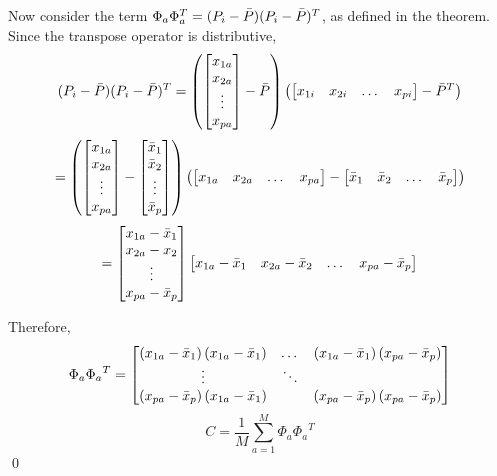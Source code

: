 \documentclass[12pt]{extarticle}
\begin{document}
        
        Now consider the term $\Phi_a \Phi_a^T = (P_i - \bar{P}) (P_i - \bar{P})^T$, as defined in the theorem. Since the transpose operator is distributive,
            \[
                (P_i - \bar{P}) (P_i - \bar{P})^T =
                    \left(
                        \begin{bmatrix}
                            x_{1a} \\
                            x_{2a} \\
                            \vdots \\
                            x_{pa}
                        \end{bmatrix} - \bar{P}
                    \right) \left(
                        \begin{bmatrix}
                            x_{1i} & x_{2i} & \dotsc & x_{pi}
                        \end{bmatrix} - \bar{P}^T
                    \right)
            \]
            \[
                =
                    \left(
                        \begin{bmatrix}
                            x_{1a} \\
                            x_{2a} \\
                            \vdots \\
                            x_{pa}
                        \end{bmatrix} - \begin{bmatrix}
                            \bar{x}_1 \\
                            \bar{x}_2\\
                            \vdots \\
                            \bar{x}_p
                        \end{bmatrix}
                    \right) \left(
                        \begin{bmatrix}
                            x_{1a} & x_{2a} & \dotsc & x_{pa}
                        \end{bmatrix} - \begin{bmatrix}
                            \bar{x}_1 & \bar{x}_2 & \dotsc & \bar{x}_p
                        \end{bmatrix}
                    \right)
            \]
            \[
                =
                    \begin{bmatrix}
                        x_{1a} - \bar{x}_1 \\
                        x_{2a} - x_2 \\
                        \vdots \\
                        x_{pa} - \bar{x}_p
                    \end{bmatrix}
                    \begin{bmatrix}
                        x_{1a} - \bar{x}_1 & x_{2a} - \bar{x}_2 & \dotsc & x_{pa} -\bar{x}_p
                    \end{bmatrix}
            \]
        
        Therefore,
            \[
                \Phi_a {\Phi_a}^T = \begin{bmatrix}
                    \left(x_{1a} - \bar{x}_1\right)\left(x_{1a} - \bar{x}_1\right) & \dotsc & \left(x_{1a} - \bar{x}_1\right) \left(x_{pa} - \bar{x}_p\right) \\
                    \vdots & \ddots & \\
                    \left(x_{pa} - \bar{x}_p\right) \left(x_{1a} - \bar{x}_1\right) & & \left(x_{pa} - \bar{x}_p\right) \left(x_{pa} - \bar{x}_p\right)
                \end{bmatrix}
            \]
            \[
                C = \frac{1}{M} \sum_{a=1}^M \Phi_a {\Phi_a}^T
            \]
            \qed
        
\end{document}

